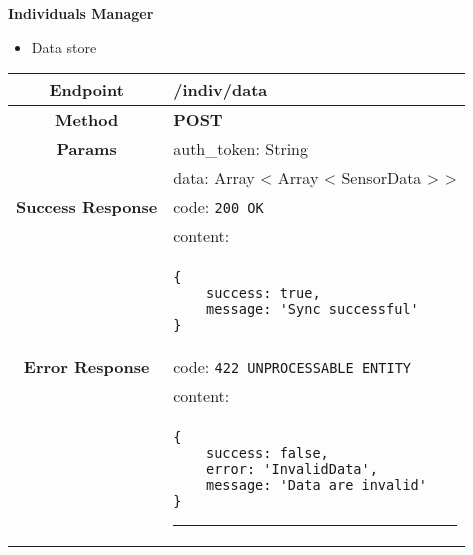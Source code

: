     \textbf{Individuals Manager}
    \begin{itemize}
        \item Data store
    \end{itemize}
    \begin{adjustwidth}{1cm}{}
        \begin{tabular}{|c|l|}
            \hline
            \textbf{Endpoint} & /indiv/data \\
            \hline
            \textbf{Method} & \textbf{POST} \\
            \hline
            \textbf{Params} & auth\_token: String \\
            &                 data: Array < Array < SensorData > > \\
            
            \hline
            \textbf{Success Response} & code: \texttt{200 OK} \\
            &                           content: \\
            & \begin{minipage}[t]{0.5\textwidth}
                \begin{adjustwidth}{1.5cm}{}
                \begin{verbatim}
{
    success: true, 
    message: 'Sync successful'
}
                \end{verbatim}
                \end{adjustwidth}
              \end{minipage} \\
              \hline
            \textbf{Error Response} & code: \texttt{422 UNPROCESSABLE ENTITY} \\
            &                         content: \\
            & \begin{minipage}[t]{0.7\textwidth}
                \begin{adjustwidth}{1.5cm}{}
                \begin{verbatim}
{
    success: false, 
    error: 'InvalidData',
    message: 'Data are invalid'
}
                \end{verbatim}
                \end{adjustwidth}
                \par\noindent\rule{\textwidth}{1pt}
                 \vspace{4pt}
              \end{minipage} \\

\end{tabular}
\end{adjustwidth}
